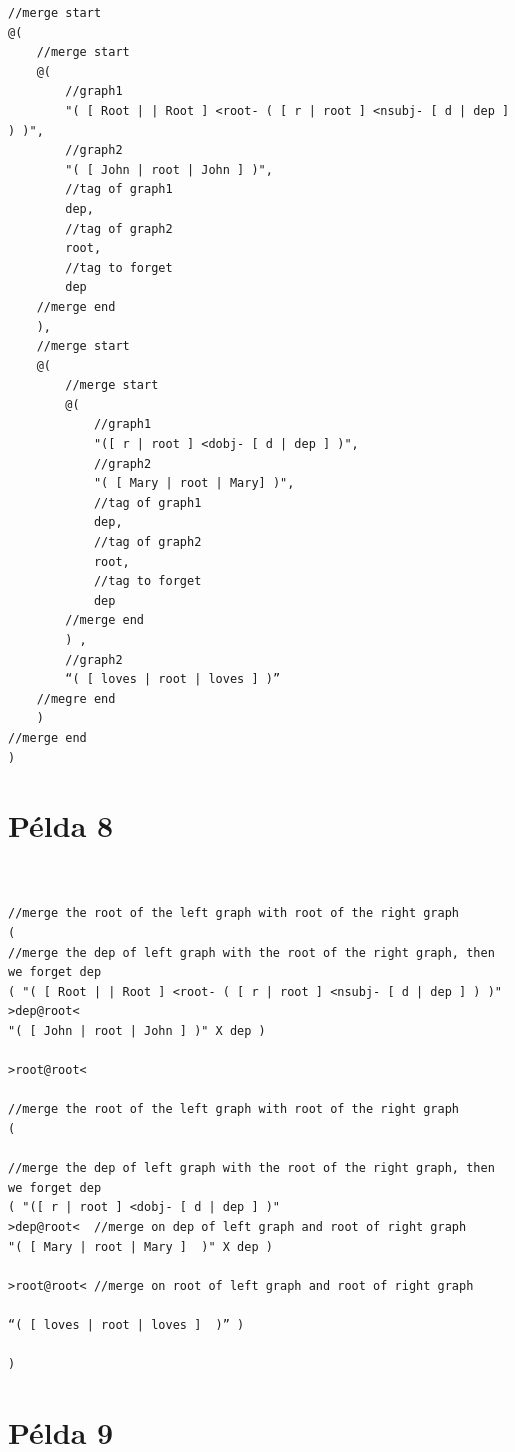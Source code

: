 \begin{verbatim}
//merge start
@(																				
	//merge start
	@(																			
		//graph1
		"( [ Root | | Root ] <root- ( [ r | root ] <nsubj- [ d | dep ] ) )",	
		//graph2
	 	"( [ John | root | John ] )",
	 	//tag of graph1
		dep,							
		//tag of graph2
		root,						
		//tag to forget	
		dep							
	//merge end
	),								
	//merge start
 	@(								
 		//merge start
		@(							
			//graph1
			"([ r | root ] <dobj- [ d | dep ] )", 		
			//graph2	
			"( [ Mary | root | Mary] )",
			//tag of graph1				
			dep,						
			//tag of graph2
			root,					
			//tag to forget	
			dep						
		//merge end
		) ,							
		//graph2
		“( [ loves | root | loves ] )”
	//megre end					
	)								
//merge end
)									
\end{verbatim}



\section{Példa 8}
\label{sec:example8}

\begin{verbatim}


//merge the root of the left graph with root of the right graph
( 
//merge the dep of left graph with the root of the right graph, then we forget dep
( "( [ Root | | Root ] <root- ( [ r | root ] <nsubj- [ d | dep ] ) )" 
>dep@root< 
"( [ John | root | John ] )" X dep ) 

>root@root<

//merge the root of the left graph with root of the right graph
( 

//merge the dep of left graph with the root of the right graph, then we forget dep
( "([ r | root ] <dobj- [ d | dep ] )" 
>dep@root< 	//merge on dep of left graph and root of right graph
"( [ Mary | root | Mary ]  )" X	dep ) 

>root@root<	//merge on root of left graph and root of right graph

“( [ loves | root | loves ]  )” )

)
\end{verbatim}



\section{Példa 9}
\label{sec:example9}




